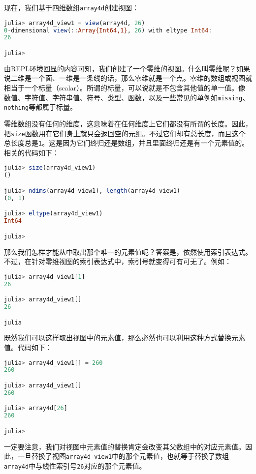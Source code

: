 现在，我们基于四维数组\verb`array4d`创建视图：

\begin{lstlisting}[language=julia]
julia> array4d_view1 = view(array4d, 26)
0-dimensional view(::Array{Int64,1}, 26) with eltype Int64:
26

julia> 
\end{lstlisting}

由REPL环境回显的内容可知，我们创建了一个零维的视图。什么叫零维呢？如果说二维是一个面、一维是一条线的话，那么零维就是一个点。零维的数组或视图就相当于一个标量（scalar）。所谓的标量，可以说就是不包含其他值的单一值。像数值、字符值、字符串值、符号、类型、函数，以及一些常见的单例如\verb`missing`、\verb`nothing`等都属于标量。

零维数组没有任何的维度，这意味着在任何维度上它们都没有所谓的长度。因此，把\verb`size`函数用在它们身上就只会返回空的元组。不过它们却有总长度，而且这个总长度总是\verb`1`。这是因为它们终归还是数组，并且里面终归还是有一个元素值的。相关的代码如下：

\begin{lstlisting}[language=julia]
julia> size(array4d_view1)
()

julia> ndims(array4d_view1), length(array4d_view1)
(0, 1)

julia> eltype(array4d_view1)
Int64

julia> 
\end{lstlisting}

那么我们怎样才能从中取出那个唯一的元素值呢？答案是，依然使用索引表达式。不过，在针对零维视图的索引表达式中，索引号就变得可有可无了。例如：

\begin{lstlisting}[language=julia]
julia> array4d_view1[1]
26

julia> array4d_view1[]
26

julia
\end{lstlisting}

既然我们可以这样取出视图中的元素值，那么必然也可以利用这种方式替换元素值。代码如下：

\begin{lstlisting}[language=julia]
julia> array4d_view1[] = 260
260

julia> array4d_view1[]
260

julia> array4d[26]
260

julia> 
\end{lstlisting}

一定要注意，我们对视图中元素值的替换肯定会改变其父数组中的对应元素值。因此，一旦替换了视图\verb`array4d_view1`中的那个元素值，也就等于替换了数组\verb`array4d`中与线性索引号\verb`26`对应的那个元素值。

